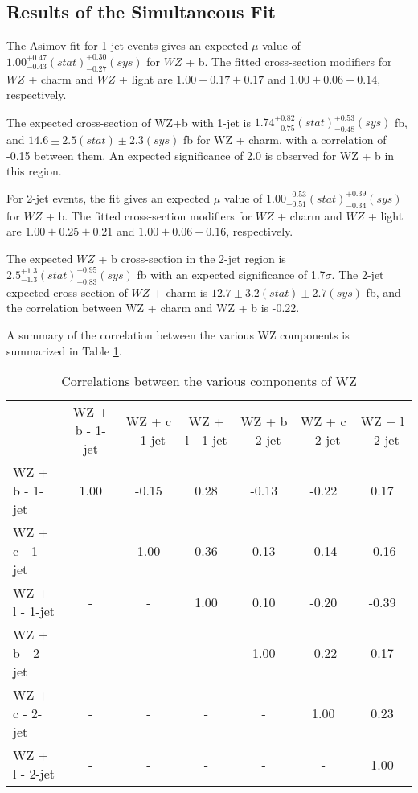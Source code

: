 \subsection{Results of the Simultaneous Fit}
\label{sec:resSum}

The Asimov fit for 1-jet events gives an expected $\mu$ value of $1.00^{+0.47}_{-0.43}(stat)^{+0.30}_{-0.27}(sys)$ for $WZ$ + b. The fitted cross-section modifiers for $WZ$ + charm and $WZ$ + light are $1.00 \pm 0.17 \pm 0.17$ and $1.00 \pm 0.06 \pm 0.14 $, respectively.

The expected cross-section of WZ+b with 1-jet is $1.74^{+0.82}_{-0.75}(stat)^{+0.53}_{-0.48}(sys)$ fb, and $14.6 \pm 2.5 (stat) \pm 2.3 (sys)$ fb for WZ + charm, with a correlation of -0.15 between them. An expected significance of 2.0 is observed for WZ + b in this region. 

For 2-jet events, the fit gives an expected $\mu$ value of $1.00^{+0.53}_{-0.51}(stat)^{+0.39}_{-0.34}(sys)$ for $WZ$ + b. The fitted cross-section modifiers for $WZ$ + charm and $WZ$ + light are $1.00 \pm 0.25 \pm 0.21$ and $1.00 \pm 0.06 \pm 0.16 $, respectively.

The expected $WZ$ + b cross-section in the 2-jet region is $2.5^{+1.3}_{-1.3}(stat)^{+0.95}_{-0.83}(sys)$ fb with an expected significance of 1.7$\sigma$. The 2-jet expected cross-section of $WZ$ + charm is $12.7 \pm 3.2 (stat) \pm 2.7 (sys)$ fb, and the correlation between WZ + charm and WZ + b is -0.22. 

A summary of the correlation between the various WZ components is summarized in Table \ref{tab:WZ_corr}.

\hspace{-1in}\begin{table}[H]
\begin{adjustwidth}{-3em}{-3em}
\begin{center}
\begin{tabular}{l|cccccc}
\hline
 & WZ + b - 1-jet & WZ + c - 1-jet & WZ + l - 1-jet & WZ + b - 2-jet & WZ + c - 2-jet & WZ + l - 2-jet\\
WZ + b - 1-jet & 1.00 & -0.15 & 0.28 & -0.13 & -0.22 & 0.17 \\
WZ + c - 1-jet & - & 1.00 & 0.36 & 0.13 & -0.14 & -0.16 \\
WZ + l - 1-jet & - & - & 1.00 & 0.10 & -0.20 & -0.39 \\
WZ + b - 2-jet & - & - & - & 1.00 & -0.22 & 0.17 \\
WZ + c - 2-jet & - & - & - & - & 1.00 & 0.23 \\
WZ + l - 2-jet & - & - & - & - & - & 1.00 \\
\hline
\end{tabular}
\caption{Correlations between the various components of WZ}
\label{tab:WZ_corr}
\end{center}
\end{adjustwidth}
\end{table}

